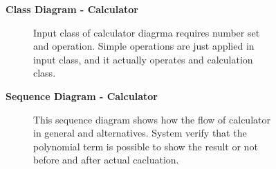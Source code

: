 \documentclass{article}
\begin{document}
		\begin{figure}[htbp]
			\textbf{Class Diagram - Calculator}
			\centering
			\begin{subfigure}{\textwidth}
				\resizebox{\textwidth}{!}{}
			\end{subfigure}
			\begin{subfigure}{\textwidth}
				Input class of calculator diagrma requires number set and operation. Simple operations are just applied in input class, and it actually operates and calculation class.
			\end{subfigure}
		\end{figure}
		\clearpage
		
		\begin{figure}[htbp]
			\textbf{Sequence Diagram - Calculator}
			\centering
			\begin{subfigure}{\textwidth}
				\centering
				\scalebox{0.8}{}
			\end{subfigure}
			\begin{subfigure}{\textwidth}
				This sequence diagram shows how the flow of calculator in general and alternatives. System verify that the polynomial term is possible to show the result or not before and after actual cacluation.
			\end{subfigure}
		\end{figure}
		\clearpage   
		
\end{document}
